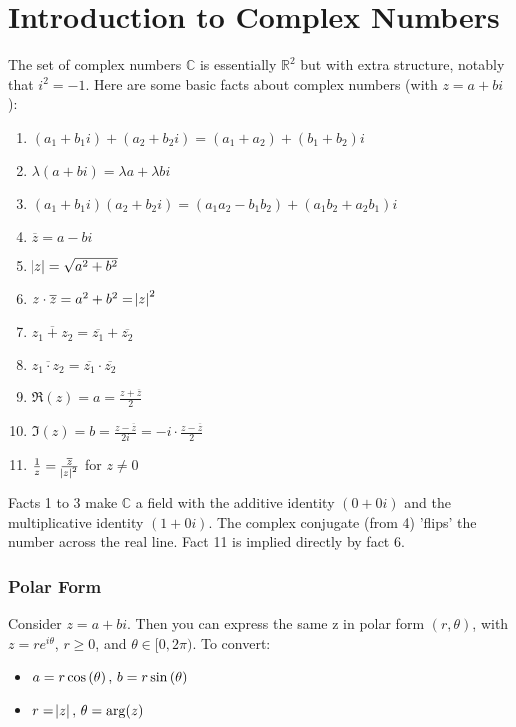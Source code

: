 \setcounter{section}{0}
\setcounter{theorem}{0}

\section{Introduction to Complex Numbers}\label{sec:intro-cplx-nums}

The set of complex numbers $\mathbb{C}$ is essentially $\mathbb{R}^2$ but with extra structure, notably that $i^2=-1$. Here are some basic facts about complex numbers (with $z=a+bi$):
\begin{enumerate}
    \item $(a_1+b_1i)+(a_2+b_2i)=(a_1+a_2)+(b_1+b_2)i$
    \item $\lambda(a+bi)=\lambda a + \lambda b i$
    \item $(a_1+b_1i)(a_2+b_2i)=(a_1a_2-b_1b_2)+(a_1b_2+a_2b_1)i$
    \item $\overline{z}=a-bi$
    \item $\abs{z}=\sqrt{a^2+b^2}$
    \item $z \cdot \overline{z}=a^2+b^2= \abs{z}^2$
    \item $\overline{z_1+z_2}=\overline{z_1}+\overline{z_2}$
    \item $\overline{z_1 \cdot z_2} = \overline{z_1} \cdot \overline{z_2}$
    \item $\Re(z)=a=\frac{z+\overline{z}}{2}$
    \item $\Im(z) = b = \frac{z-\overline{z}}{2i} = -i\cdot\frac{z-\overline{z}}{2}$
    \item $\frac{1}{z} = \frac{\overline{z}}{\abs{z}^2}$ for $z \neq 0$
\end{enumerate}

Facts 1 to 3 make $\mathbb{C}$ a field with the additive identity $(0+0i)$ and the multiplicative identity $(1+0i)$. The complex conjugate (from 4) 'flips' the number across the real line. Fact 11 is implied directly by fact 6.

\subsubsection{Polar Form}

Consider $z=a+bi$. Then you can express the same z in polar form $(r,\theta)$, with $z= r e^{i\theta}$, $r\geq0$, and $\theta \in [0,2 \pi)$. To convert:
\begin{itemize}
    \item $a=r \cos \left(  \theta  \right) , \, b=r \sin \left( \theta \right)$
    \item $r = \abs{z}, \, \theta = \arg(z)$
\end{itemize}

